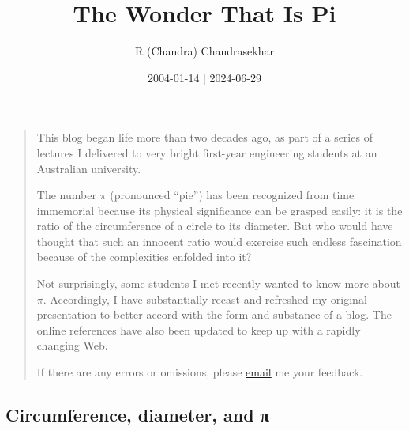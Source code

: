 \documentclass[
  a4paper,
]{article}
\title{The Wonder That Is Pi}
\author{R (Chandra) Chandrasekhar}
\date{2004-01-14 | 2024-06-29}
\begin{document}
\maketitle

\thispagestyle{empty}


\begin{quote}
This blog began life more than two decades ago, as part of a series of
lectures I delivered to very bright first-year engineering students at
an Australian university.

The number \(\pi\) (pronounced ``pie'') has been recognized from time
immemorial because its physical significance can be grasped easily: it
is the ratio of the circumference of a circle to its diameter. But who
would have thought that such an innocent ratio would exercise such
endless fascination because of the complexities enfolded into it?

Not surprisingly, some students I met recently wanted to know more about
\(\pi\). Accordingly, I have substantially recast and refreshed my
original presentation to better accord with the form and substance of a
blog. The online references have also been updated to keep up with a
rapidly changing Web.

If there are any errors or omissions, please
\href{mailto:feedback.swanlotus@gmail.com}{email} me your feedback.
\end{quote}

\subsection{Circumference, diameter, and
π}\label{circumference-diameter-and-ux3c0}
\end{document}
